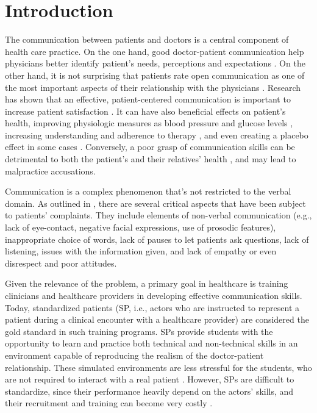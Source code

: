 \section{Introduction}
\label{sec:intro}

The communication between patients and doctors is a central component of health care practice. On the one hand, good doctor-patient communication help physicians better identify patient's needs, perceptions and expectations \cite{Longnecker2010}.
On the other hand, it is not surprising that patients rate open communication as one of the most important aspects of their relationship with the physicians \cite{dibbelt2010patient}.
Research has shown that an effective, patient-centered communication is important to increase patient satisfaction  \cite{fiscella2004patient,franks2005patients,hickson2002patient,kee2018communication,kohatsu2004characteristics,papadakis2005disciplinary,stelfox2005relation}. It can have also beneficial effects on patient's health, improving physiologic measures as blood pressure and glucose levels \cite{stewart1995effective}, increasing understanding and adherence to therapy \cite{King2013}, and even creating a placebo effect in some cases \cite{kelley2009patient}.  Conversely, a poor grasp of communication skills can be detrimental to both the patient's and their relatives' health \cite{judge2004affect,kee2018communication}, and may lead to malpractice accusations.

Communication is a complex phenomenon that's not restricted to the verbal domain. As outlined in \cite{kee2018communication}, there are several critical aspects that have been subject to patients' complaints. They include elements of non-verbal communication (e.g., lack of eye-contact, negative facial expressions, use of  prosodic features), inappropriate choice of words, lack of pauses to let patients ask questions, lack of listening, issues with the information given, and lack of empathy or even disrespect and poor attitudes.


Given the relevance of the problem, a primary goal in healthcare is training clinicians and healthcare providers in developing effective communication skills. Today, standardized patients (SP, i.e., actors who are instructed to represent a patient during a clinical encounter with a healthcare provider) are considered the gold standard in such training programs. SPs provide students with the opportunity to learn and practice both technical and non-technical skills in an environment capable of reproducing the realism of the doctor-patient relationship. These simulated environments are less stressful for the students, who are not required to interact with a real patient \cite{forrest2013essential,kneebone2006human}. 
However, SPs are difficult to standardize, since their performance heavily depend on the actors' skills, and their recruitment and training can become very costly \cite{Nestel2011}.

